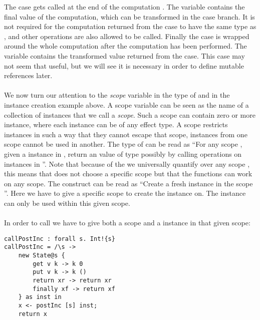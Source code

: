 The  case gets called at the end of the computation .
The variable  contains the final value of the computation, which can be transformed in the case branch.
It is not required for the computation returned from the case to have the same type as , and other operations are also allowed to be called.
Finally the  case is wrapped around the whole computation  after the  computation has been performed.
The variable  contains the transformed value returned from the  case.
This case may not seem that useful, but we will see it is necessary in order to define mutable references later.
\\\\
We now turn our attention to the \emph{scope} variable  in the type of  and in the instance creation example above.
A scope variable can be seen as the name of a collection of instances that we call a \emph{scope}.
Such a scope can contain zero or more instance, where each instance can be of any effect type.
A scope restricts instances in such a way that they cannot escape that scope, instances from one scope cannot be used in another.
The type of  can be read as ``For any scope , given a  instance in , return an value of type  possibly by calling operations on instances in ''. Note that because of the  we universally quantify over any scope , this means that  does not choose a specific scope but that the functions can work on any scope. The construct  can be read as ``Create a fresh  instance in the scope ''. Here we have to give a specific scope  to create the instance on. The instance can only be used within this given scope.
\\\\
In order to call  we have to give both a scope and a  instance in that given scope:
\begin{verbatim}
callPostInc : forall s. Int!{s}
callPostInc = /\s ->
	new State@s {
		get v k -> k 0
		put v k -> k ()
		return xr -> return xr
		finally xf -> return xf
	} as inst in
	x <- postInc [s] inst;
	return x
\end{verbatim}

